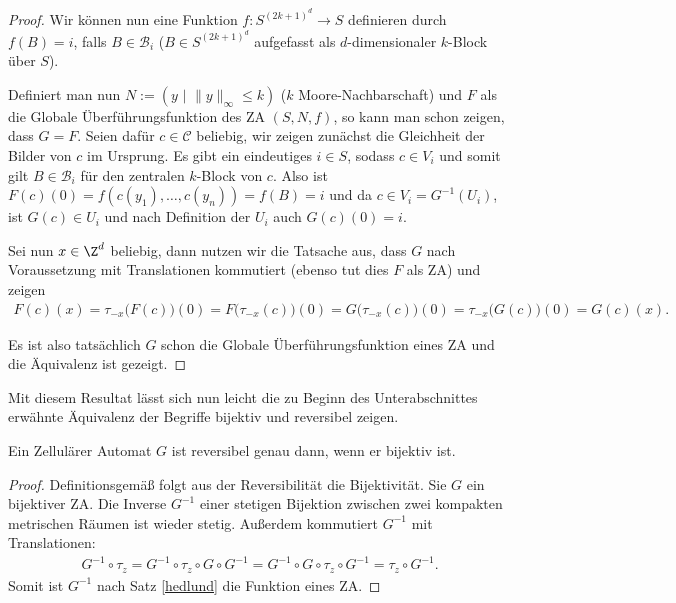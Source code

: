 \begin{proof}
  Wir können nun eine Funktion $f: S^{(2k+1)^d} \to S$ definieren durch $f(B) = i$, falls $B \in \mathcal{B}_i$ ($B \in S^{(2k+1)^d}$ aufgefasst als $d$-dimensionaler $k$-Block über $S$).

  Definiert man nun $N := (y \text{~}|\text{~} \|y\|_\infty \leq k)$ ($k$ Moore-Nachbarschaft) und $F$ als die Globale Überführungsfunktion des ZA $(S,N,f)$, so kann man schon zeigen, dass $G = F$.
  Seien dafür $c \in \mathcal{C}$ beliebig, wir zeigen zunächst die Gleichheit der Bilder von $c$ im Ursprung. Es gibt ein eindeutiges $i \in S$, sodass $c \in V_i$ und somit gilt $B \in \mathcal{B}_i$ für den zentralen $k$-Block von $c$. Also ist $F(c)(0) = f(c(y_1), \dots, c(y_n)) = f(B) = i$ und da $c \in V_i = G^{-1}(U_i)$, ist $G(c) \in U_i$ und nach Definition der $U_i$ auch $G(c)(0) = i$.

  Sei nun $x \in \Z^d$ beliebig, dann nutzen wir die Tatsache aus, dass $G$ nach Voraussetzung mit Translationen kommutiert (ebenso tut dies $F$ als ZA) und zeigen
  \begin{align*}
    F(c)(x) = \tau_{-x}\big(F(c)\big)(0) = F\big(\tau_{-x}(c)\big) (0) = G\big(\tau_{-x}(c)\big) (0) = \tau_{-x}\big(G(c)\big)(0) = G(c)(x).
  \end{align*}

  Es ist also tatsächlich $G$ schon die Globale Überführungsfunktion eines ZA und die Äquivalenz ist gezeigt.
\end{proof}

Mit diesem Resultat lässt sich nun leicht die zu Beginn des Unterabschnittes erwähnte Äquivalenz der Begriffe bijektiv und reversibel zeigen.

\begin{corollary}
  Ein Zellulärer Automat $G$ ist reversibel genau dann, wenn er bijektiv ist.
\end{corollary}

\begin{proof}
  Definitionsgemäß folgt aus der Reversibilität die Bijektivität.
  Sie $G$ ein bijektiver ZA. Die Inverse $G^{-1}$ einer stetigen Bijektion zwischen zwei kompakten metrischen Räumen ist wieder stetig. Außerdem kommutiert $G^{-1}$ mit Translationen:
  \begin{align*}
    G^{-1} \circ \tau_{z} = G^{-1} \circ \tau_{z} \circ G \circ G^{-1} = G^{-1} \circ G \circ \tau_{z} \circ G^{-1} = \tau_{z} \circ G^{-1}.
  \end{align*}
   Somit ist $G^{-1}$ nach Satz \ref{hedlund} die Funktion eines ZA.
\end{proof}

